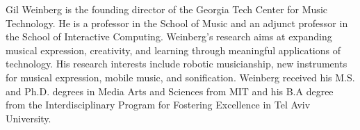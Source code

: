 \documentclass[final,1p,times]{elsarticle}
\begin{document}
\noindent Gil Weinberg is the founding director of the Georgia Tech Center for Music Technology. He is a professor in the School of Music and an adjunct professor in the School of Interactive Computing. Weinberg's research aims at expanding musical expression, creativity, and learning through meaningful applications of technology. His research interests include robotic musicianship, new instruments for musical expression, mobile music, and sonification. Weinberg received his M.S. and Ph.D. degrees in Media Arts and Sciences from MIT and his B.A degree from the Interdisciplinary Program for Fostering Excellence in Tel Aviv University.
\end{document}
